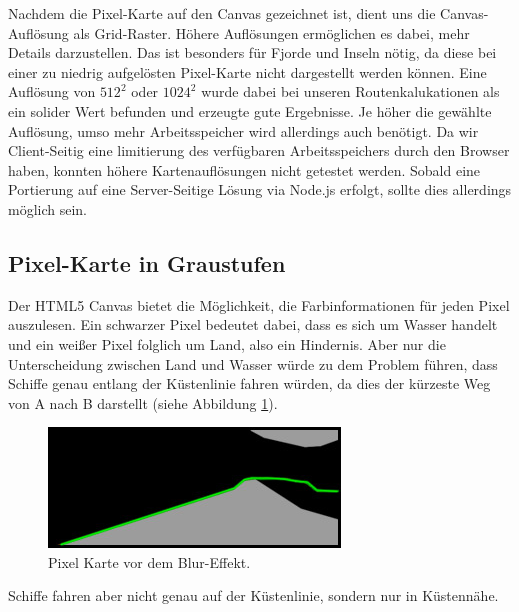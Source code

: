 \documentclass[letterpaper]{article}
\begin{document}

	Nachdem die Pixel-Karte auf den Canvas gezeichnet ist, dient uns die Canvas-Auflösung als Grid-Raster. Höhere Auflösungen ermöglichen es dabei, mehr Details darzustellen. Das ist besonders für Fjorde und Inseln nötig, da diese bei einer zu niedrig aufgelösten Pixel-Karte nicht dargestellt werden können. Eine Auflösung von $512^2$ oder $1024^2$ wurde dabei bei unseren Routenkalukationen als ein solider Wert befunden und erzeugte gute Ergebnisse. Je höher die gewählte Auflösung, umso mehr Arbeitsspeicher wird allerdings auch benötigt. Da wir Client-Seitig eine limitierung des verfügbaren Arbeitsspeichers durch den Browser haben, konnten höhere Kartenauflösungen nicht getestet werden. Sobald eine Portierung auf eine Server-Seitige Lösung via Node.js erfolgt, sollte dies allerdings möglich sein.

	\subsection{Pixel-Karte in Graustufen}
		Der HTML5 Canvas bietet die Möglichkeit, die Farbinformationen für jeden Pixel auszulesen. Ein schwarzer Pixel bedeutet dabei, dass es sich um Wasser handelt und ein weißer Pixel folglich um Land, also ein Hindernis. Aber nur die Unterscheidung zwischen Land und Wasser würde zu dem Problem führen, dass Schiffe genau entlang der Küstenlinie fahren würden, da dies der kürzeste Weg von A nach B darstellt (siehe Abbildung \ref{fig:route before blur}).

		\begin{figure}[!htbp]
			\centering
			\includegraphics[width=.7\linewidth]{route_before_blur}
			\caption[]{Pixel Karte vor dem Blur-Effekt.\footnotemark}
			\label{fig:route before blur}
		\end{figure}

		Schiffe fahren aber nicht genau auf der Küstenlinie, sondern nur in Küstennähe.
\end{document}
